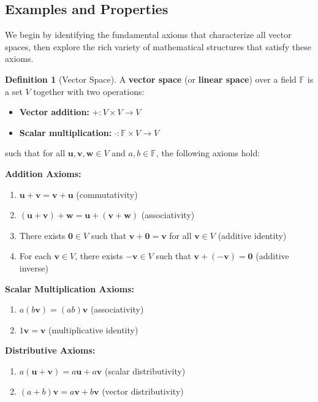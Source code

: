 \documentclass[12pt]{article}
\numberwithin{equation}{section}
\newcommand{\vect}[1]{\boldsymbol{#1}}   %
\theoremstyle{plain}
\theoremstyle{definition}
\newtheorem{definition}[theorem]{Definition}
\theoremstyle{remark}
\begin{document}
\subsection{Examples and Properties}

We begin by identifying the fundamental axioms that characterize all vector spaces, then explore the rich variety of mathematical structures that satisfy these axioms.

\begin{definition}[Vector Space]
A \textbf{vector space} (or \textbf{linear space}) over a field $\mathbb{F}$ is a set $V$ together with two operations:
\begin{itemize}
\item \textbf{Vector addition:} $+: V \times V \to V$
\item \textbf{Scalar multiplication:} $\cdot: \mathbb{F} \times V \to V$
\end{itemize}
such that for all $\vect{u}, \vect{v}, \vect{w} \in V$ and $a, b \in \mathbb{F}$, the following axioms hold:

\textbf{Addition Axioms:}
\begin{enumerate}[label=\textbf{A\arabic*}]
\item $\vect{u} + \vect{v} = \vect{v} + \vect{u}$ (commutativity)
\item $(\vect{u} + \vect{v}) + \vect{w} = \vect{u} + (\vect{v} + \vect{w})$ (associativity)
\item There exists $\vect{0} \in V$ such that $\vect{v} + \vect{0} = \vect{v}$ for all $\vect{v} \in V$ (additive identity)
\item For each $\vect{v} \in V$, there exists $-\vect{v} \in V$ such that $\vect{v} + (-\vect{v}) = \vect{0}$ (additive inverse)
\end{enumerate}

\textbf{Scalar Multiplication Axioms:}
\begin{enumerate}[label=\textbf{M\arabic*}]
\item $a(b\vect{v}) = (ab)\vect{v}$ (associativity)
\item $1\vect{v} = \vect{v}$ (multiplicative identity)
\end{enumerate}

\textbf{Distributive Axioms:}
\begin{enumerate}[label=\textbf{D\arabic*}]
\item $a(\vect{u} + \vect{v}) = a\vect{u} + a\vect{v}$ (scalar distributivity)
\item $(a + b)\vect{v} = a\vect{v} + b\vect{v}$ (vector distributivity)
\end{enumerate}
\end{definition}
\end{document}
